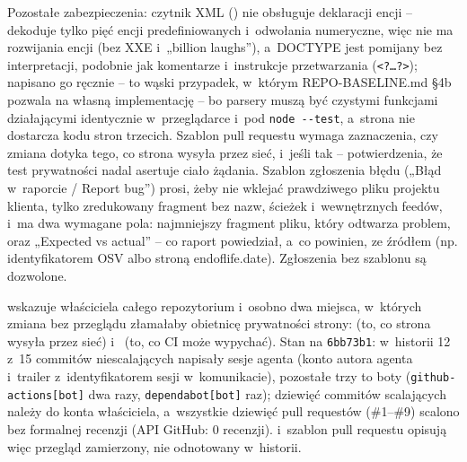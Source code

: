Pozostałe zabezpieczenia: czytnik XML () nie obsługuje deklaracji encji
-- dekoduje tylko pięć encji predefiniowanych i~odwołania numeryczne, więc nie ma rozwijania
encji (bez XXE i~„billion laughs”), a~DOCTYPE jest pomijany bez interpretacji, podobnie jak
komentarze i~instrukcje przetwarzania (\texttt{<?…?>}); napisano go ręcznie -- to wąski
przypadek, w~którym REPO-BASELINE.md §4b pozwala na własną implementację -- bo parsery muszą
być czystymi funkcjami działającymi identycznie w~przeglądarce i~pod \texttt{node -{}-test},
a~strona nie dostarcza kodu stron trzecich. Szablon pull requestu wymaga zaznaczenia, czy
zmiana dotyka tego, co strona wysyła przez sieć, i~jeśli tak -- potwierdzenia, że test
prywatności nadal asertuje ciało żądania. Szablon zgłoszenia błędu („Błąd w~raporcie /
Report bug”) prosi, żeby nie wklejać prawdziwego pliku projektu klienta, tylko zredukowany
fragment bez nazw, ścieżek i~wewnętrznych feedów, i~ma dwa wymagane pola: najmniejszy
fragment pliku, który odtwarza problem, oraz „Expected vs actual” -- co raport powiedział,
a~co powinien, ze źródłem (np. identyfikatorem OSV albo stroną endoflife.date). Zgłoszenia
bez szablonu są dozwolone.

 wskazuje właściciela całego repozytorium i~osobno dwa miejsca,
w~których zmiana bez przeglądu złamałaby obietnicę prywatności strony:
 (to, co strona wysyła przez sieć) i~ (to, co
CI może wypychać). Stan na \texttt{6bb73b1}: w~historii  12 z~15 commitów
niescalających napisały sesje agenta (konto autora agenta i~trailer z~identyfikatorem sesji
w~komunikacie), pozostałe trzy to boty (\texttt{github-actions[bot]} dwa razy,
\texttt{dependabot[bot]} raz); dziewięć commitów scalających należy do konta właściciela,
a~wszystkie dziewięć pull requestów (\#1--\#9) scalono bez formalnej recenzji (API GitHub:
0 recenzji).  i~szablon pull requestu opisują więc przegląd zamierzony,
nie odnotowany w~historii.



